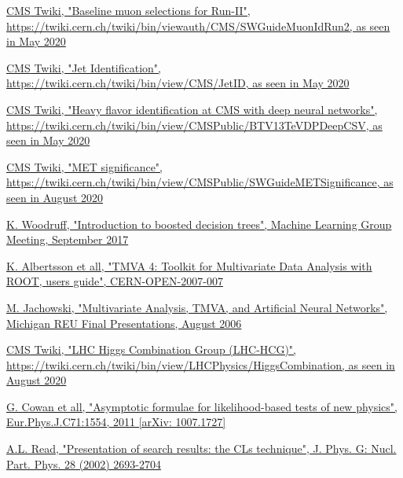 \documentclass[a4paper, 10pt, openright]{report}
\begin{document}
\begin{thebibliography}{1}
\href{https://twiki.cern.ch/twiki/bin/viewauth/CMS/SWGuideMuonIdRun2}{\ac{CMS} Twiki,
"Baseline muon selections for Run-II", \url{https://twiki.cern.ch/twiki/bin/viewauth/CMS/SWGuideMuonIdRun2}, as seen in May 2020}

\href{https://twiki.cern.ch/twiki/bin/view/CMS/JetID}{\ac{CMS} Twiki,
"Jet Identification", \url{https://twiki.cern.ch/twiki/bin/view/CMS/JetID}, as seen in May 2020}

\href{https://twiki.cern.ch/twiki/bin/view/CMSPublic/BTV13TeVDPDeepCSV}{\ac{CMS} Twiki,
"Heavy flavor identification at CMS with deep neural networks", \url{https://twiki.cern.ch/twiki/bin/view/CMSPublic/BTV13TeVDPDeepCSV}, as seen in May 2020}

\href{https://twiki.cern.ch/twiki/bin/view/CMSPublic/SWGuideMETSignificance}{\ac{CMS} Twiki, "MET significance", \url{https://twiki.cern.ch/twiki/bin/view/CMSPublic/SWGuideMETSignificance}, as seen in August 2020}

\href{https://indico.fnal.gov/event/15356/contributions/31377/attachments/19671/24560/DecisionTrees.pdf}{K. Woodruff,
"Introduction to boosted decision trees", Machine Learning Group Meeting, September 2017}

\href{https://indico.cern.ch/event/5007/contributions/1177811/attachments/962648/1366777/reu_presentation3.pdf}{K. Albertsson et all,
"TMVA 4: Toolkit for Multivariate Data Analysis with ROOT, users guide", CERN-OPEN-2007-007}

\href{https://root.cern.ch/root/htmldoc/guides/tmva/TMVAUsersGuide.pdf}{M. Jachowski,
"Multivariate Analysis, TMVA, and Artificial Neural Networks", Michigan REU Final Presentations, August 2006}

\href{https://twiki.cern.ch/twiki/bin/view/LHCPhysics/HiggsCombination}{\ac{CMS} Twiki,
"LHC Higgs Combination Group (LHC-HCG)", \url{https://twiki.cern.ch/twiki/bin/view/LHCPhysics/HiggsCombination}, as seen in August 2020}

\href{https://arxiv.org/abs/1007.1727}{G. Cowan et all,
"Asymptotic formulae for likelihood-based tests of new physics", Eur.Phys.J.C71:1554, 2011 [arXiv: 1007.1727]}

\href{https://indico.cern.ch/event/398949/attachments/799330/1095613/The\_CLs\_Technique.pdf}{A.L. Read, "Presentation of search results: the CLs technique", J. Phys. G: Nucl. Part. Phys. 28 (2002) 2693-2704}


\end{thebibliography}
\end{document}
